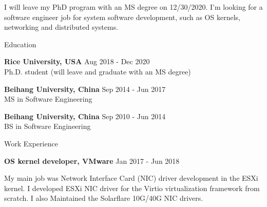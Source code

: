 \documentclass{resume} %
\begin{document}


I will leave my PhD program with an MS degree on 12/30/2020.
I'm looking for a software engineer job for system software development,
such as OS kernels, networking and distributed systems.


\begin{rSection}{Education}

{\bf Rice University, USA} \hfill { Aug 2018 - Dec 2020}
\\ Ph.D. student (will leave and graduate with an MS degree)

{\bf Beihang University, China} \hfill { Sep 2014 - Jun 2017}
\\ MS in Software Engineering

{\bf Beihang University, China} \hfill { Sep 2010 - Jun 2014}
\\ BS in Software Engineering

\end{rSection}



\begin{rSection}{Work Experience}

\item {\bf OS kernel developer, VMware} \hfill { Jan 2017 - Jun 2018}

My main job was Network Interface Card (NIC) driver development in the
ESXi kernel.
I developed ESXi NIC driver for the Virtio virtualization framework from
scratch.
I also Maintained the Solarflare 10G/40G NIC drivers.

\vspace{2mm}

\end{rSection}
\end{document}
